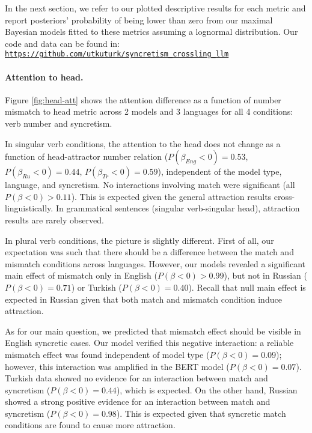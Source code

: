 \documentclass[10pt,letterpaper]{article}
\begin{document}
In the next section, we refer to our plotted descriptive results for each metric and report posteriors' probability of being lower than zero from our maximal Bayesian models fitted to these metrics assuming a lognormal distribution. Our code and data can be found in: \href{https://github.com/utkuturk/syncretism_crossling_llm}{\texttt{https://github.com/utkuturk/syncretism\_crossling\_llm}}

\paragraph{Attention to head.}

Figure \ref{fig:head-att} shows the attention difference as a function of number mismatch to head metric across 2 models and 3 languages for all 4 conditions: verb number and syncretism. 

In singular verb conditions, the attention to the head does not change as a function of head-attractor number relation ($P(\beta_{Eng} < 0) = 0.53$, $P(\beta_{Ru} < 0) = 0.44$, $P(\beta_{Tr} < 0) = 0.59$), independent of the model type, language, and syncretism. No interactions involving match were significant (all $P(\beta < 0) > 0.11$). This is expected given the general attraction results cross-linguistically. In grammatical sentences (singular verb-singular head), attraction results are rarely observed.  

In plural verb conditions, the picture is slightly different. First of all, our expectation was such that there should be a difference  between the match and mismatch conditions across languages. However, our models revealed a significant main effect of mismatch only in English ($P(\beta < 0) > 0.99$), but not in Russian ($P(\beta < 0) = 0.71$) or Turkish ($P(\beta < 0) = 0.40$). Recall that null main effect is expected in Russian given that both match and mismatch condition induce attraction.

As for our main question, we predicted that mismatch effect should be visible in English syncretic cases. Our model verified this negative interaction: a reliable mismatch effect was found independent of model type ($P(\beta < 0) = 0.09$); however, this interaction was amplified in the BERT model ($P(\beta < 0) = 0.07$). Turkish data showed no evidence for an interaction between match and syncretism ($P(\beta < 0) = 0.44$), which is expected. On the other hand, Russian showed a strong positive evidence for an interaction between match and syncretism ($P(\beta < 0) = 0.98$). This is expected given that syncretic match conditions are found to cause more attraction. 
\end{document}
